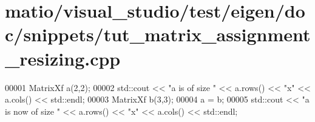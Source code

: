 \hypertarget{matio_2visual__studio_2test_2eigen_2doc_2snippets_2tut__matrix__assignment__resizing_8cpp_source}{}\section{matio/visual\+\_\+studio/test/eigen/doc/snippets/tut\+\_\+matrix\+\_\+assignment\+\_\+resizing.cpp}
\label{matio_2visual__studio_2test_2eigen_2doc_2snippets_2tut__matrix__assignment__resizing_8cpp_source}

\begin{DoxyCode}
00001 MatrixXf a(2,2);
00002 std::cout << \textcolor{stringliteral}{"a is of size "} << a.rows() << \textcolor{stringliteral}{"x"} << a.cols() << std::endl;
00003 MatrixXf b(3,3);
00004 a = b;
00005 std::cout << \textcolor{stringliteral}{"a is now of size "} << a.rows() << \textcolor{stringliteral}{"x"} << a.cols() << std::endl;
\end{DoxyCode}
